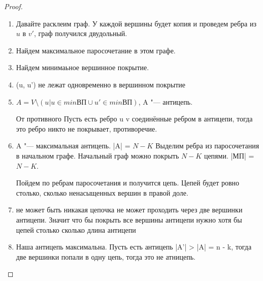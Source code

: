 \begin{proof}                                              
\begin{enumerate}
\item  Давайте расклеим граф. У каждой вершины будет копия и проведем ребра из $u$ в $v'$, граф получился двудольный. 
\item  Найдем максимальное паросочетание в этом графе.
\item  Найдем минимаьное вершинное покрытие. 
\item  (u, u') не лежат одновременно в вершинном покрытие
\item  $A = V \setminus (u| u \in min ВП \cup u' \in min ВП)$, A "--- антицепь.

От противного
Пусть есть ребро u v соединённые ребром в антицепи, тогда это ребро никто не покрывает, противоречие.
\item A "--- максимальная антицепь.
|A| = $N - K$
Выделим ребра из паросочетания в начальном графе. Начальный граф можно покрыть $N - K$ цепями. 
|МП| = $N - K$. 

Пойдем по ребрам паросочетания и получится цепь. Цепей будет ровно столько, сколько ненасыщенных вершин в правой доле. 

\item не может быть никакая цепочка не может проходить через две вершинки антицепи. Значит что бы покрыть все вершины антицепи нужно хотя бы цепей столько
сколько длина антицепи

\item Наша антицепь максимальна. Пусть есть антицепь |A'| > |A| = n - k, тогда две вершинки попали в одну цепь, тогда это не атницепь. 
\end{enumerate}
\end{proof}